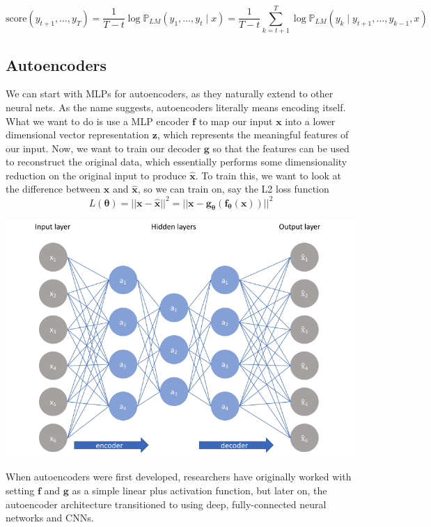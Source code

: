 \documentclass{article}
\theoremstyle{definition}
\theoremstyle{remark}
\theoremstyle{definition}
\begin{document}
\[\mathrm{score}(y_{t+1}, \ldots, y_T) = \frac{1}{T-t} \log \mathbb{P}_{LM} (y_1, \ldots, y_t \mid x) = \frac{1}{T-t} \sum_{k=t+1}^T \log \mathbb{P}_{LM} ( y_k \mid y_{t+1}, \ldots, y_{k-1}, x) \]

\subsection{Autoencoders}

We can start with MLPs for autoencoders, as they naturally extend to other neural nets. As the name suggests, autoencoders literally means encoding itself. What we want to do is use a MLP encoder $\mathbf{f}$ to map our input $\mathbf{x}$ into a lower dimensional vector representation $\mathbf{z}$, which represents the meaningful features of our input. Now, we want to train our decoder $\mathbf{g}$ so that the features can be used to reconstruct the original data, which essentially performs some dimensionality reduction on the original input to produce $\hat{\mathbf{x}}$. To train this, we want to look at the difference between $\mathbf{x}$ and $\hat{\mathbf{x}}$, so we can train on, say the L2 loss function 
\[L(\boldsymbol{\theta}) = ||\mathbf{x} - \hat{\mathbf{x}}||^2 = ||\mathbf{x} - \mathbf{g}_{\boldsymbol{\theta}} ( \mathbf{f}_{\boldsymbol{\theta}} (\mathbf{x}))||^2 \]
\begin{center}
    \includegraphics[scale=0.3]{Images/autoencoder.png}
\end{center}
When autoencoders were first developed, researchers have originally worked with setting $\mathbf{f}$ and $\mathbf{g}$ as a simple linear plus activation function, but later on, the autoencoder architecture transitioned to using deep, fully-connected neural networks and CNNs. 
\end{document}
